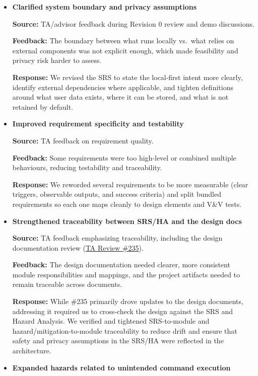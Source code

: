 \documentclass{article}
\begin{document}
\begin{itemize}

\item \textbf{Clarified system boundary and privacy assumptions}

\textbf{Source:} TA/advisor feedback during Revision 0 review and demo discussions.

\textbf{Feedback:} The boundary between what runs locally vs.\ what relies on
external components was not explicit enough, which made feasibility and privacy
risk harder to assess.

\textbf{Response:} We revised the SRS to state the local-first intent more
clearly, identify external dependencies where applicable, and tighten definitions
around what user data exists, where it can be stored, and what is not retained by
default.

\item \textbf{Improved requirement specificity and testability}

\textbf{Source:} TA feedback on requirement quality.

\textbf{Feedback:} Some requirements were too high-level or combined multiple
behaviours, reducing testability and traceability.

\textbf{Response:} We reworded several requirements to be more measurable (clear
triggers, observable outputs, and success criteria) and split bundled
requirements so each one maps cleanly to design elements and V\&V tests.

\item \textbf{Strengthened traceability between SRS/HA and the design docs}

\textbf{Source:} TA feedback emphasizing traceability, including the design
documentation review
(\href{https://github.com/speech-buddies/VoiceBridge/issues/235}{TA Review \#235}).

\textbf{Feedback:} The design documentation needed clearer, more consistent
module responsibilities and mappings, and the project artifacts needed to remain
traceable across documents.

\textbf{Response:} While \#235 primarily drove updates to the design documents,
addressing it required us to cross-check the design against the SRS and Hazard
Analysis. We verified and tightened SRS-to-module and hazard/mitigation-to-module
traceability to reduce drift and ensure that safety and privacy assumptions in
the SRS/HA were reflected in the architecture.

\item \textbf{Expanded hazards related to unintended command execution}


\end{itemize}
\end{document}
